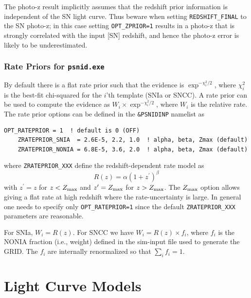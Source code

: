 \documentclass[12pt]{article}
\newcommand{\psnid}{{\tt psnid.exe}}
\newcommand{\zmax}{Z_{\rm max}}
\begin{document}
The photo-z result implicitly assumes
that the redshift prior information is independent
of the SN light curve.
Thus beware when setting  {\tt REDSHIFT\_FINAL}
to the SN photo-z; in this case setting {\tt OPT\_ZPRIOR=1} 
results in a photo-z that is strongly correlated with the 
input [SN] redshift, and hence the photo-z error is likely to be
underestimated.



\clearpage
\subsubsection{Rate Priors for {\psnid}}
\label{sss:psnid_rateprior}

\newcommand{\zprim}{z^{\prime}}

By default there is a flat rate prior such that the evidence is 
$\exp^{-\chi_i^2/2}$, where  $\chi_i^2$ is the best-fit chi-squared
for the $i$'th template (SNIa or SNCC).
A rate prior can be used to compute the evidence as
$W_i \times \exp^{-\chi_i^2/2}$, where $W_i$ is the relative rate.
The rate prior options can be defined in the {\tt \&PSNIDINP}
namelist as

\begin{Verbatim}[frame=single]
    OPT_RATEPRIOR = 1  ! default is 0 (OFF)
    ZRATEPRIOR_SNIA  = 2.6E-5, 2.2, 1.0  ! alpha, beta, Zmax (default)
    ZRATEPRIOR_NONIA = 6.8E-5, 3.6, 2.0  ! alpha, beta, Zmax (default)
\end{Verbatim}
%
where {\tt ZRATEPRIOR\_XXX} define the redshift-dependent
rate model as 
\begin{equation}
  R(z) = \alpha (1+ \zprim)^{\beta}
\end{equation}
%
with $\zprim = z$ for $z < \zmax$ 
and $\zprim = \zmax$ for $z > \zmax$. 
The $\zmax$ option allows giving a flat rate at high redshift where
the rate-uncertainty is large. In general one needs to specify
only {\tt OPT\_RATEPRIOR=1} since the default {\tt ZRATEPRIOR\_XXX}
parameters are reasonable.

For SNIa, $W_i = R(z)$.  For SNCC we have $W_i = R(z) \times f_i$,
where $f_i$ is the NONIA fraction (i.e., weight) 
defined in the sim-input file used to generate the GRID. 
The $f_i$ are internally 
renormalized so that $\sum_i f_i = 1$.


   \clearpage
   \section{Light Curve Models}
   \label{sec:models}
\end{document}
